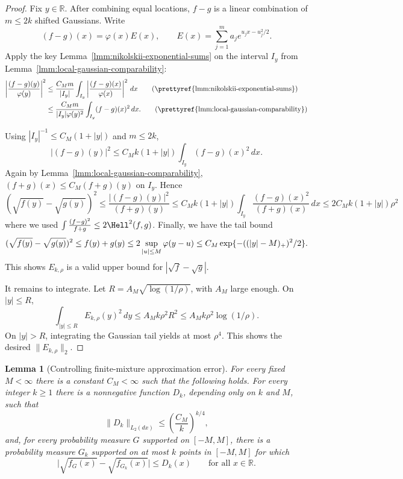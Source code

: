 \documentclass[letterpaper,11pt]{article}
\def\exp{\mathop{\rm exp}}
\newtheorem{lemma}[theorem]{Lemma}
\theoremstyle{definition}
\begin{document}
\begin{proof}
Fix $y\in\mathbb R$.  After combining equal locations, $f-g$ is a linear combination of $m\le2k$ shifted Gaussians.  Write
\[
(f-g)(x)=\varphi(x)E(x),
\qquad
E(x)=\sum_{j=1}^m a_j e^{u_jx-u_j^2/2}.
\]
Apply the key Lemma~\ref{lmm:nikolskii-exponential-sums} on the interval
$I_y$ from Lemma~\ref{lmm:local-gaussian-comparability}:
\begin{align*}
\left|\frac{(f-g)(y)}{\varphi(y)}\right|^2
&\le
\frac{C_M m}{|I_y|}
\int_{I_y}
\left|\frac{(f-g)(x)}{\varphi(x)}\right|^2\,dx \tag{\prettyref{lmm:nikolskii-exponential-sums}}
\\
&\le \frac{C_M m}{|I_y|\varphi(y)^2}
\int_{I_y}(f-g)(x)^2\,dx . \tag{\prettyref{lmm:local-gaussian-comparability}}
\end{align*}


Using $|I_y|^{-1}\le C_M(1+|y|)$ and $m\le2k$,
\[
|(f-g)(y)|^2
\le
C_M k(1+|y|)\int_{I_y}(f-g)(x)^2\,dx .
\]
Again by Lemma~\ref{lmm:local-gaussian-comparability},
$(f+g)(x)\le C_M(f+g)(y)$ on $I_y$.  Hence
\[
(\sqrt{f(y)}-\sqrt{g(y)})^2\leq 
\frac{|(f-g)(y)|^2}{(f+g)(y)}
\le
C_M k(1+|y|)
\int_{I_y}\frac{(f-g)(x)^2}{(f+g)(x)}\,dx
\le
2C_M k(1+|y|)\rho^2
\]
where we used $\int \frac{(f-g)^2}{f+g} \leq 2\Hell^2(f,g)$.
Finally, we have the tail bound
\[
(\sqrt{ f(y)}-\sqrt{g(y)})^2\leq 
f(y)+g(y)
\le
2\sup_{|u|\le M}\varphi(y-u)
\le
C_M\exp\{-((|y|-M)_+)^2/2\}.
\]
This shows $E_{k,\rho}$ is a valid upper bound for $|\sqrt f-\sqrt g|$.

It remains to integrate.  Let $R=A_M\sqrt{\log(1/\rho)}$, with $A_M$
large enough.  On $|y|\le R$,
\[
\int_{|y|\le R} E_{k,\rho}(y)^2\,dy
\le
A_M k\rho^2 R^2
\le
A_M k\rho^2\log(1/\rho).
\]
On $|y|>R$, integrating the Gaussian tail yields at most $\rho^4$. This shows the desired $\|E_{k,\rho}\|_2$.
\end{proof}


\begin{lemma}[Controlling finite-mixture approximation error]
\label{lmm:sqrt-quadrature-envelope}
For every fixed $M<\infty$ there is a constant $C_M<\infty$ such
that the following holds.  For every integer $k\ge1$ there is a nonnegative
function $D_k$, depending only on $k$ and $M$, such that
\[
\|D_k\|_{L_2(dx)}
\le
\left(\frac{C_M}{k}\right)^{k/4},
\]
and, for every probability measure $G$ supported on $[-M,M]$, there is a
probability measure $G_k$ supported on at most $k$ points in $[-M,M]$
for which
\[
\bigl|\sqrt{f_G(x)}-\sqrt{f_{G_k}(x)}\bigr|
\le D_k(x)
\qquad\text{for all }x\in\mathbb R .
\]
\end{lemma}
\end{document}
